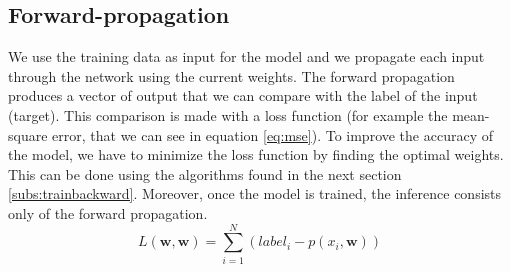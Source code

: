 \subsection{Forward-propagation} \label{subs:trainforward}
We use the training data as input for the model and we propagate each input through the network using the current weights. The forward propagation produces a vector of output that we can compare with the label of the input (target). This comparison is made with a loss function (for example the mean-square error, that we can see in equation \eqref{eq:mse}). To improve the accuracy of the model, we have to minimize the loss function by finding the optimal weights. This can be done using the algorithms found in the next section \ref{subs:trainbackward}. Moreover, once the model is trained, the inference consists only of the forward propagation.
%
\begin{equation}
    L(\boldsymbol{w}, \boldsymbol{w}) = \sum^{N}_{i=1} (label_i - p(x_i, \boldsymbol{w}))
    \label{eq:mse}
\end{equation}
